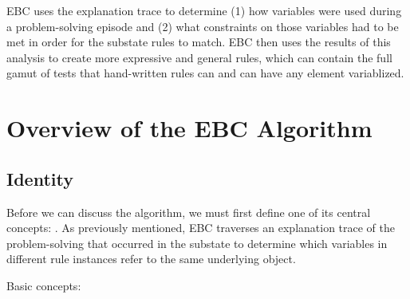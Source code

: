 EBC uses the explanation trace to determine (1) how variables were used during a problem-solving episode and (2) what constraints on those variables had to be met in order for the substate rules to match.  EBC then uses the results of this analysis to create more expressive and general rules, which can contain the full gamut of tests that hand-written rules can and can have any element variablized.


\section{Overview of the EBC Algorithm}
\label{CHUNKING-ebc}

\subsection{Identity}

Before we can discuss the algorithm, we must first define one of its central concepts: .  As previously mentioned, EBC traverses an explanation trace of the problem-solving that occurred in the substate to determine which variables in different rule instances refer to the same underlying object.  

Basic concepts:

